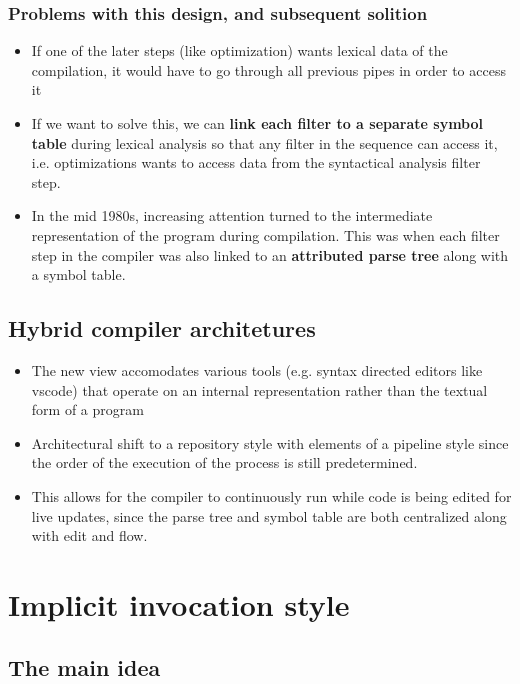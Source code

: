 \documentclass[12pt]{book}
\begin{document}
\subsection{Problems with this design, and subsequent solition}

\begin{itemize}
    \item If one of the later steps (like optimization) wants lexical data of the compilation, it would have to go through all previous pipes in order to access it
    \item If we want to solve this, we can \textbf{link each filter to a separate symbol table} during lexical analysis so that any filter in the sequence can access it, i.e. optimizations wants to access data from the syntactical analysis filter step.
    \item In the mid 1980s, increasing attention turned to the intermediate representation of the program during compilation. This was when each filter step in the compiler was also linked to an \textbf{attributed parse tree} along with a symbol table.
\end{itemize}

\section{Hybrid compiler architetures}

\begin{itemize}
    \item The new view accomodates various tools (e.g. syntax directed editors like vscode) that operate on an internal representation rather than the textual form of a program
    \item Architectural shift to a repository style with elements of a pipeline style since the order of the execution of the process is still predetermined.
    \item This allows for the compiler to continuously run while code is being edited for live updates, since the parse tree and symbol table are both centralized along with edit and flow.
\end{itemize}

\chapter{Implicit invocation style}

\section{The main idea}
\end{document}
